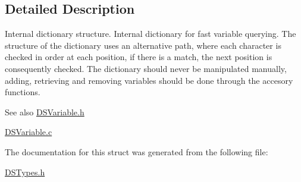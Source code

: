 \subsection{Detailed Description}
Internal dictionary structure. Internal dictionary for fast variable querying. The structure of the dictionary uses an alternative path, where each character is checked in order at each position, if there is a match, the next position is consequently checked. The dictionary should never be manipulated manually, adding, retrieving and removing variables should be done through the accesory functions.

\begin{DoxySeeAlso}{See also}
\hyperlink{_d_s_variable_8h}{DSVariable.h} 

\hyperlink{_d_s_variable_8c}{DSVariable.c} 
\end{DoxySeeAlso}


The documentation for this struct was generated from the following file:\begin{DoxyCompactItemize}
\item 
\hyperlink{_d_s_types_8h}{DSTypes.h}\end{DoxyCompactItemize}

